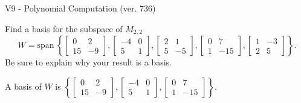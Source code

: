 \begin{exercise}
  \begin{exerciseTitle}V9 - Polynomial Computation (ver. 736)\end{exerciseTitle}
  \begin{exerciseStatement}
    Find a basis for the subspace of \(M_{2,2}\) 
\[W=\mathrm{span}\ \left\{\left[\begin{array}{cc}
0 & 2 \\
15 & -9
\end{array}\right] , \left[\begin{array}{cc}
-4 & 0 \\
5 & 1
\end{array}\right] , \left[\begin{array}{cc}
2 & 1 \\
5 & -5
\end{array}\right] , \left[\begin{array}{cc}
0 & 7 \\
1 & -15
\end{array}\right] , \left[\begin{array}{cc}
1 & -3 \\
2 & 5
\end{array}\right]\right\}.\]
 Be sure to explain why your result is a basis.


  \end{exerciseStatement}
  \begin{exerciseAnswer}
   A basis of \(W\) is  \(\left\{\left[\begin{array}{cc}
0 & 2 \\
15 & -9
\end{array}\right] , \left[\begin{array}{cc}
-4 & 0 \\
5 & 1
\end{array}\right] , \left[\begin{array}{cc}
0 & 7 \\
1 & -15
\end{array}\right]\right\}\).
  


  \end{exerciseAnswer}
\end{exercise}